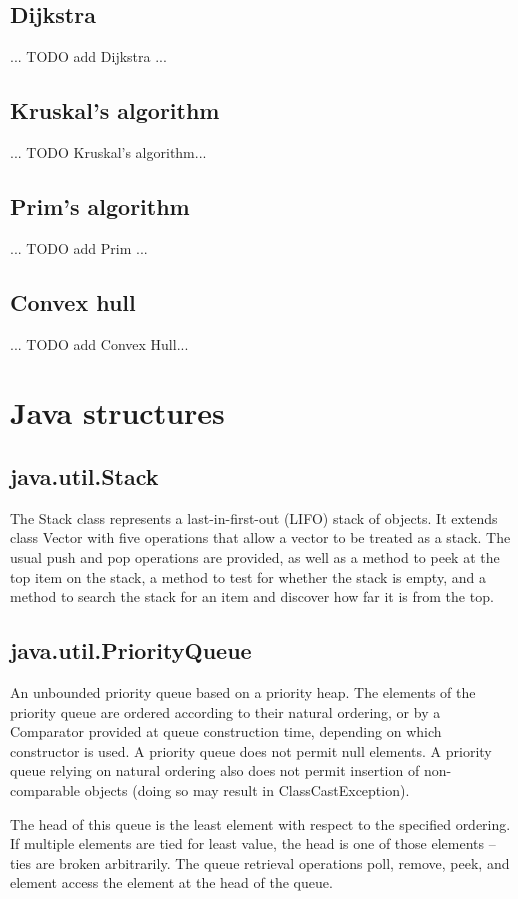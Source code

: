 \documentclass[a4paper]{article}
\begin{document}
\subsection{Dijkstra}
... TODO add Dijkstra ...


\subsection{Kruskal's algorithm}
... TODO Kruskal's algorithm...


\subsection{Prim's algorithm}
... TODO add Prim ...


\subsection{Convex hull}
... TODO add Convex Hull...




\section{Java structures}

\subsection{java.util.Stack}
The Stack class represents a last-in-first-out (LIFO) stack of objects. It extends class Vector with five operations that allow a vector to be treated as a stack. The usual push and pop operations are provided, as well as a method to peek at the top item on the stack, a method to test for whether the stack is empty, and a method to search the stack for an item and discover how far it is from the top.

\subsection{java.util.PriorityQueue}
An unbounded priority queue based on a priority heap. The elements of the priority queue are ordered according to their natural ordering, or by a Comparator provided at queue construction time, depending on which constructor is used. A priority queue does not permit null elements. A priority queue relying on natural ordering also does not permit insertion of non-comparable objects (doing so may result in ClassCastException).

The head of this queue is the least element with respect to the specified ordering. If multiple elements are tied for least value, the head is one of those elements -- ties are broken arbitrarily. The queue retrieval operations poll, remove, peek, and element access the element at the head of the queue.
\end{document}

